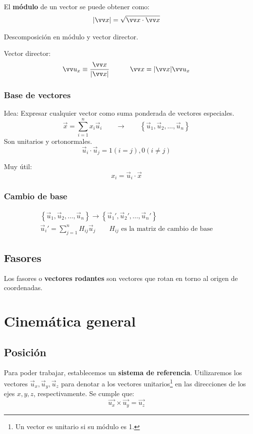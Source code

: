 \documentclass[a4paper]{book}
\begin{document}
El \textbf{módulo} de un vector se puede obtener como: \[\abs{\vec{x}}=\sqrt{\vec{x}\cdot \vec{x}}\]

Descomposición en módulo y vector director.

Vector director: \[\vec{u_x}\equiv \frac{\vec{x}}{\abs{\vec{x}}} \qquad \quad \vec{x} = \abs{\vec{x}}\vec{u_x}\]

\subsubsection{Base de vectores}
Idea: Expresar cualquier vector como suma ponderada de vectores especiales. \[\vec{x} = \sum^{n}_{i=1}{x_i\vec{u}_i}\qquad \longrightarrow \qquad \left\lbrace \vec{u}_1,\vec{u}_2,\ldots ,\vec{u}_n \right\rbrace\]
Son unitarios y ortonormales. \[\vec{u}_i\cdot \vec{u}_j =1 (i=j), 0(i\not =j)\]

Muy útil: \[x_i = \vec{u}_i \cdot \vec{x}\]

\subsubsection{Cambio de base}
\[\begin{split}
		\left\lbrace \vec{u}_1,\vec{u}_2,\ldots ,\vec{u}_n \right\rbrace \longrightarrow \left\lbrace \vec{u}_1',\vec{u}_2',\ldots ,\vec{u}_n' \right\rbrace \\  \vec{u}_i' = \sum^{n}_{j=1}{H_{ij}\vec{u}_j} \qquad H_{ij} \text{ es la matriz de cambio de base}
	\end{split}\]

\subsection{Fasores} \label{subsec:fasores}
Los fasores o \textbf{vectores rodantes} son vectores que rotan en torno al origen de coordenadas.
\section{Cinemática general}


\subsection{Posición}
Para poder trabajar, establecemos un \textbf{sistema de referencia}. Utilizaremos los vectores $\vec{u}_x, \vec{u}_y, \vec{u}_z$ para denotar a los vectores unitarios\footnote{Un vector es unitario si su módulo es 1.} en las direcciones de los ejes $x, y, z$, respectivamente. Se cumple que: \[\vec{u_x} \times \vec{u_y} = \vec{u_z} \]
\end{document}
